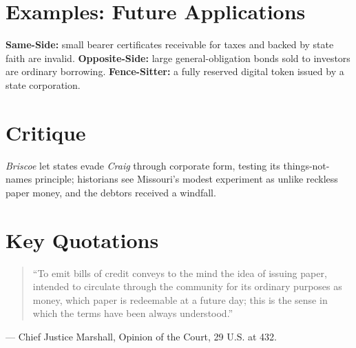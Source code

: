 \documentclass[12pt]{article}
\begin{document}
\section{Examples: Future Applications}
\textbf{Same-Side:} small bearer certificates receivable for taxes and backed by state faith are invalid. \textbf{Opposite-Side:} large general-obligation bonds sold to investors are ordinary borrowing. \textbf{Fence-Sitter:} a fully reserved digital token issued by a state corporation.

\section{Critique}
\textit{Briscoe} let states evade \textit{Craig} through corporate form, testing its things-not-names principle; historians see Missouri's modest experiment as unlike reckless paper money, and the debtors received a windfall.

\section{Key Quotations}
\begin{quote}
``To emit bills of credit conveys to the mind the idea of issuing paper, intended to circulate through the community for its ordinary purposes as money, which paper is redeemable at a future day; this is the sense in which the terms have been always understood.''
\end{quote}
\noindent --- Chief Justice Marshall, Opinion of the Court, 29 U.S. at 432.
\end{document}

